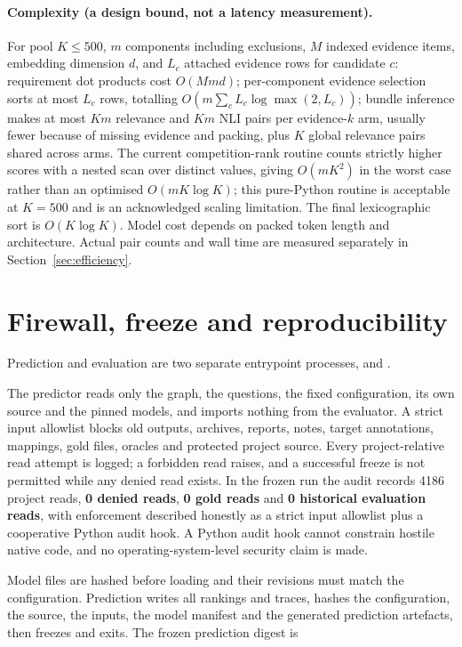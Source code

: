 \documentclass[11pt,a4paper]{article}
\begin{document}
\paragraph{Complexity (a design bound, not a latency measurement).} For pool $K \le 500$, $m$ components including exclusions, $M$ indexed evidence items, embedding dimension $d$, and $L_c$ attached evidence rows for candidate $c$: requirement dot products cost $O(Mmd)$; per-component evidence selection sorts at most $L_c$ rows, totalling $O\!\left( m \sum_c L_c \log \max(2,L_c) \right)$; bundle inference makes at most $Km$ relevance and $Km$ NLI pairs per evidence-$k$ arm, usually fewer because of missing evidence and packing, plus $K$ global relevance pairs shared across arms. The current competition-rank routine counts strictly higher scores with a nested scan over distinct values, giving $O(mK^2)$ in the worst case rather than an optimised $O(mK\log K)$; this pure-Python routine is acceptable at $K=500$ and is an acknowledged scaling limitation. The final lexicographic sort is $O(K \log K)$. Model cost depends on packed token length and architecture. Actual pair counts and wall time are measured separately in Section~\ref{sec:efficiency}.

\section{Firewall, freeze and reproducibility}
\label{sec:freeze}

Prediction and evaluation are two separate entrypoint processes,  and .

The predictor reads only the graph, the questions, the fixed configuration, its own source and the pinned models, and imports nothing from the evaluator. A strict input allowlist blocks old outputs, archives, reports, notes, target annotations, mappings, gold files, oracles and protected project source. Every project-relative read attempt is logged; a forbidden read raises, and a successful freeze is not permitted while any denied read exists. In the frozen run the audit records 4186 project reads, \textbf{0 denied reads}, \textbf{0 gold reads} and \textbf{0 historical evaluation reads}, with enforcement described honestly as a strict input allowlist plus a cooperative Python audit hook. A Python audit hook cannot constrain hostile native code, and no operating-system-level security claim is made.

Model files are hashed before loading and their revisions must match the configuration. Prediction writes all rankings and traces, hashes the configuration, the source, the inputs, the model manifest and the generated prediction artefacts, then freezes and exits. The frozen prediction digest is
\end{document}
